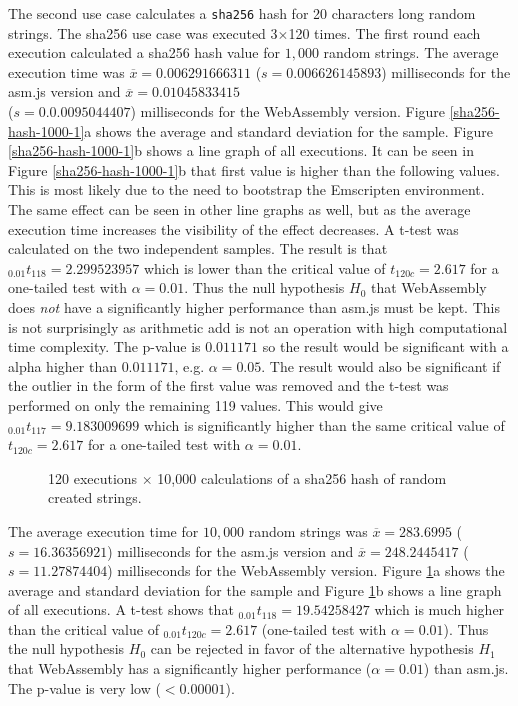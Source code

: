 The second use case calculates a \texttt{sha256} hash for 20 characters long random strings. The sha256 use case was executed 3$\times$120 times. The first round each execution calculated a sha256 hash value for $1,000$ random strings. The average execution time was $\overline{x}=0.006291666311$ ($s=0.006626145893$) milliseconds for the asm.js version and $\overline{x}=0.01045833415$ \\ ($s=0.0.0095044407$) milliseconds for the WebAssembly version. Figure \ref{sha256-hash-1000-1}a shows the average and standard deviation for the sample. Figure \ref{sha256-hash-1000-1}b shows a line graph of all executions. It can be seen in Figure \ref{sha256-hash-1000-1}b that first value is higher than the following values. This is most likely due to the need to bootstrap the Emscripten environment. The same effect can be seen in other line graphs as well, but as the average execution time increases the visibility of the effect decreases. A t-test was calculated on the two independent samples. The result is that $_{0.01}t_{118}=2.299523957$ which is lower than the critical value of $t_{120c}=2.617$ for a one-tailed test with $\alpha = 0.01$. Thus the null hypothesis $H_{0}$ that WebAssembly does \emph{not} have a significantly higher performance than asm.js must be kept. This is not surprisingly as arithmetic add is not an operation with high computational time complexity. The p-value is $0.011171$ so the result would be significant with a alpha higher than $0.011171$, e.g. $\alpha = 0.05$. The result would also be significant if the outlier in the form of the first value was removed and the t-test was performed on only the remaining 119 values. This would give $_{0.01}t_{117}=9.183009699$ which is significantly higher than the same critical value of $t_{120c}=2.617$ for a one-tailed test with $\alpha = 0.01$. 

\begin{figure}[!h]%
\centering
{}%
{}%
\caption{120 executions $\times$ 10,000 calculations of a sha256 hash of random created strings.}%
\label{sha256-hash-10000-1}%
\end{figure}
    
The average execution time for $10,000$ random strings was $\overline{x}=283.6995$ ($s=16.36356921$) milliseconds for the asm.js version and $\overline{x}=248.2445417$ ($s=11.27874404$) milliseconds for the WebAssembly version. Figure \ref{sha256-hash-10000-1}a shows the average and standard deviation for the sample and Figure \ref{sha256-hash-10000-1}b shows a line graph of all executions. A t-test shows that $_{0.01}t_{118}=19.54258427$ which is much higher than the critical value of $_{0.01}t_{120c}=2.617$ (one-tailed test with $\alpha = 0.01$). Thus the null hypothesis $H_{0}$ can be rejected in favor of the alternative hypothesis $H_{1}$ that WebAssembly has a significantly higher performance ($\alpha = 0.01$) than asm.js. The p-value is very low ($<0.00001$).

